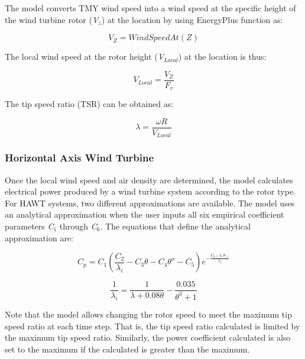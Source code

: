 The model converts TMY wind speed into a wind speed at the specific height of the wind turbine rotor (\emph{V\(_{z}\)}) at the location by using EnergyPlus function as:

\begin{equation}
{V_Z} = WindSpeedAt(Z)
\end{equation}

The local wind speed at the rotor height (\emph{V\(_{Local}\)}) at the location is thus:

\begin{equation}
{V_{Local}} = \frac{{{V_Z}}}{{{F_v}}}
\end{equation}

The tip speed ratio (TSR) can be obtained as:

\begin{equation}
\lambda  = \frac{{\omega R}}{{{V_{Local}}}}
\end{equation}

\subsubsection{Horizontal Axis Wind Turbine}\label{horizontal-axis-wind-turbine}

Once the local wind speed and air density are determined, the model calculates electrical power produced by a wind turbine system according to the rotor type. For HAWT systems, two different approximations are available. The model uses an analytical approximation when the user inputs all six empirical coefficient parameters \emph{C\(_{1}\)} through \emph{C\(_{6}\)}. The equations that define the analytical approximation are:

\begin{equation}
{C_p} = {C_1}(\frac{{{C_2}}}{{{\lambda_i}}} - {C_3}\theta  - {C_4}{\theta ^x} - {C_5}){e^{ - \frac{{{C_6}(\lambda ,\theta )}}{{{\lambda_i}}}}}
\end{equation}

\begin{equation}
\frac{1}{{{\lambda_i}}} = \frac{1}{{\lambda  + 0.08\theta }} - \frac{{0.035}}{{{\theta ^3} + 1}}
\end{equation}

Note that the model allows changing the rotor speed to meet the maximum tip speed ratio at each time step. That is, the tip speed ratio calculated is limited by the maximum tip speed ratio. Similarly, the power coefficient calculated is also set to the maximum if the calculated is greater than the maximum.

